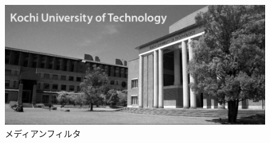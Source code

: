 \begin{figure}[H]
\begin{minipage}[b]{.49\textwidth}
\begin{minipage}[b]{.49\textwidth}
            \subcaption{\wgnimg}
        \end{minipage}
        \begin{minipage}[b]{.49\textwidth}
            \includegraphics[keepaspectratio,width=\textwidth]{../../Figures/06_24_mf_img_in.png}
            \subcaption{\inimg}
        \end{minipage}
        \caption{メディアンフィルタ}
    \end{minipage}
\end{figure}
